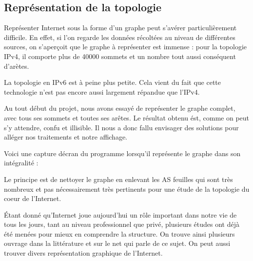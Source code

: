 
% 

\subsection{Repr\'esentation de la topologie}

Repr\'esenter Internet sous la forme d'un graphe peut s'av\'erer particulièrement difficile. En effet, si l'on regarde les donn\'ees r\'ecolt\'ees au niveau de diff\'erentes sources, on s'aperçoit que le graphe \`a repr\'esenter est immense : pour la topologie IPv4, il comporte plus de 40000 sommets et un nombre tout aussi cons\'equent d'ar\`etes.
\par
La topologie en IPv6 est \`a peine plus petite. Cela vient du fait que cette technologie n'est pas encore aussi largement r\'epandue que l'IPv4.

\par
Au tout d\'ebut du projet, nous avons essayé de repr\'esenter le graphe complet, avec tous ses sommets et toutes ses ar\^etes. Le r\'esultat obtenu \'est, comme on peut s'y attendre, confu et illisible. Il nous a donc fallu envisager des solutions pour all\'eger nos traitements et notre affichage.
\par
Voici une capture d\'ecran du programme lorsqu'il repr\'esente le graphe dans son int\'egralit\'e :
\par
Le principe est de nettoyer le graphe en enlevant les AS feuilles qui sont tr\`es nombreux et pas nécessairement tr\`es pertinents pour une \'etude de la topologie du coeur de l'Internet. 
\par
\'Etant donn\'e qu'Internet joue aujourd'hui un r\^ole important dans notre vie de tous les jours, tant au niveau professionnel que priv\'e, plusieurs \'etudes ont d\'ej\`a \'et\'e men\'ees pour mieux en comprendre la structure.
On trouve ainsi plusieurs ouvrage dans la litt\'erature et sur le net qui parle de ce sujet. On peut aussi trouver divers repr\'esentation graphique de l'Internet.

%